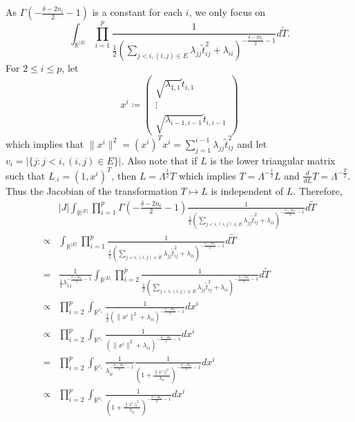 \documentclass[12pt, leqno]{article}
\providecommand{\abs}[1]{\lvert#1\rvert}
\providecommand{\norm}[1]{\lVert#1\rVert}
\begin{document}
As $\Gamma(-\frac{\delta-2n_i}{2}-1)$ is a constant for each $i$, we
only focus on 
\[
\int_{\mathbb{R}^{\abs{E}}} \prod_{i=1}^p \frac{1}{\frac{1}{2}(\sum_{j<i,(i,j) \in E}\lambda_{jj}
                \tilde{t}_{ij}^2 +
  \lambda_{ii})^{-\frac{\delta-2n_i}{2}-1}} d\tilde{T}.
\]
For $2 \leq i \leq p$, let 
\[
x^i \coloneqq \begin{pmatrix} \sqrt{\lambda_{1,1}} 
  \tilde{t}_{i,1} \\ \vdots \\ \sqrt{\lambda_{i-1,i-1}} \tilde{t}_{i,i-1} \end{pmatrix}
\]
which implies that $\norm{x^i}^2 = (x^i)^T x^i  = \sum_{j=1}^{i-1}\lambda_{jj}
                \tilde{t}_{ij}^2$ and let $v_i = \abs{\{j:j<i,(i,j) \in
                  E\}}$. Also note that if $L$ is the lower triangular
                matrix such that $L_{.i} = (1,x^i)^T$, then $L =
                \Lambda^{\frac{1}{2}} T$ which implies $T =
                \Lambda^{-\frac{1}{2}} L$ and $\frac{d}{dL} T =
                \Lambda^{-\frac{T}{2}}$. Thus the Jacobian of the
                transformation $T \mapsto L$ is independent of $L$.
Therefore, 
\begin{align*}
&\abs{J} \int_{\mathbb{R}^{\abs{E}}} \prod_{i=1}^p  \Gamma(-\frac{\delta-2n_i}{2}-1) \frac{1}{\frac{1}{2}(\sum_{j<i,(i,j) \in E}\lambda_{jj}
                \tilde{t}_{ij}^2 +
  \lambda_{ii})^{-\frac{\delta-2n_i}{2}-1}} d\tilde{T} \\
\propto& \int_{\mathbb{R}^{\abs{E}}} \prod_{i=1}^p \frac{1}{\frac{1}{2}(\sum_{j<i,(i,j) \in E}\lambda_{jj}
                \tilde{t}_{ij}^2 +
  \lambda_{ii})^{-\frac{\delta-2n_i}{2}-1}} d\tilde{T} \\
=& \frac{1}{\frac{1}{2}
  \lambda_{11}^{-\frac{\delta-2n_1}{2}-1}} \int_{\mathbb{R}^{\abs{E}}}  \prod_{i=2}^p \frac{1}{\frac{1}{2}(\sum_{j<i,(i,j) \in E}\lambda_{jj}
                \tilde{t}_{ij}^2 +
  \lambda_{ii})^{-\frac{\delta-2n_i}{2}-1}} d\tilde{T} \\
\propto& \prod_{i=2}^p \int_{\mathbb{R}^{v_i}} \frac{1}{\frac{1}{2}(\norm{x^i}^2+
  \lambda_{ii})^{-\frac{\delta-2n_i}{2}-1}} d{x^i}\\
\propto& \prod_{i=2}^p \int_{\mathbb{R}^{v_i}} \frac{1}{(\norm{x^i}^2+
  \lambda_{ii})^{-\frac{\delta-2n_i}{2}-1}} d{x^i}\\
=& \prod_{i=2}^p \int_{\mathbb{R}^{v_i}}
   \frac{1}{\lambda_{ii}^{-\frac{\delta-2n_i}{2}-1}}\frac{1}{(1+\frac{\norm{x^i}^2}{\lambda_{ii}})^{-\frac{\delta-2n_i}{2}-1}}
   d{x^i} \\
\propto& \prod_{i=2}^p \int_{\mathbb{R}^{v_i}}
   \frac{1}{(1+\frac{\norm{x^i}^2}{\lambda_{ii}})^{-\frac{\delta-2n_i}{2}-1}}
   d{x^i}
\end{align*}
\end{document}
